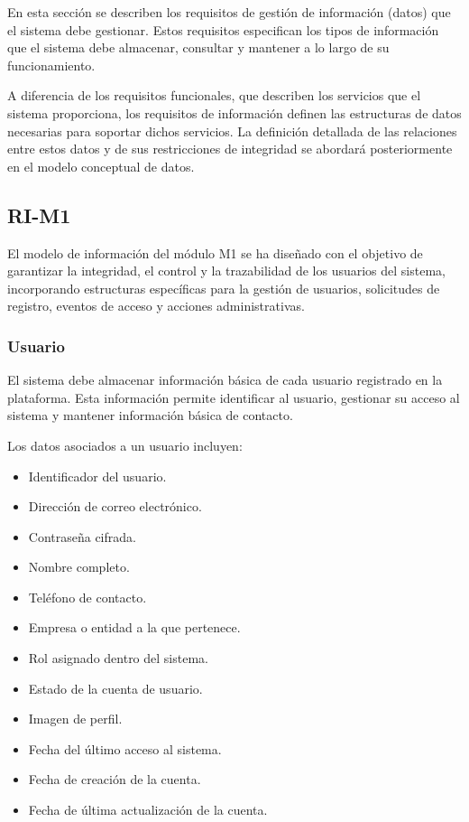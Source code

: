 En esta sección se describen los requisitos de gestión de información (datos) que el sistema debe gestionar. Estos requisitos especifican los tipos de información que el sistema debe almacenar, consultar y mantener a lo largo de su funcionamiento.

A diferencia de los requisitos funcionales, que describen los servicios que el sistema proporciona, los requisitos de información definen las estructuras de datos necesarias para soportar dichos servicios. La definición detallada de las relaciones entre estos datos y de sus restricciones de integridad se abordará posteriormente en el modelo conceptual de datos.

\subsection{RI-M1}

El modelo de información del módulo M1 se ha diseñado con el objetivo de garantizar la integridad, el control y la trazabilidad de los usuarios del sistema, incorporando estructuras específicas para la gestión de usuarios, solicitudes de registro, eventos de acceso y acciones administrativas.

\subsubsection*{Usuario}

El sistema debe almacenar información básica de cada usuario registrado en la plataforma. Esta información permite identificar al usuario, gestionar su acceso al sistema y mantener información básica de contacto.

Los datos asociados a un usuario incluyen:

\begin{itemize}
    \item Identificador del usuario.
    \item Dirección de correo electrónico.
    \item Contraseña cifrada.
    \item Nombre completo.
    \item Teléfono de contacto.
    \item Empresa o entidad a la que pertenece.
    \item Rol asignado dentro del sistema.
    \item Estado de la cuenta de usuario.
    \item Imagen de perfil.
    \item Fecha del último acceso al sistema.
    \item Fecha de creación de la cuenta.
    \item Fecha de última actualización de la cuenta.
\end{itemize}

